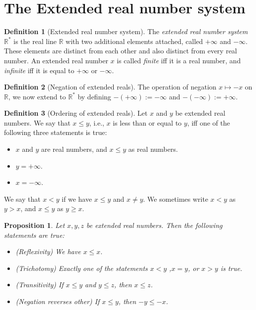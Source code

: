 \documentclass[
]{book}
\providecommand{\tightlist}{%
  \setlength{\itemsep}{0pt}\setlength{\parskip}{0pt}}
\newtheorem{proposition}{Proposition}[chapter]
\theoremstyle{definition}
\newtheorem{definition}{Definition}[chapter]
\theoremstyle{definition}
\theoremstyle{definition}
\theoremstyle{definition}
\theoremstyle{remark}
\begin{document}
\section{The Extended real number system}\label{the-extended-real-number-system}

\begin{definition}[Extended real number system]
The \emph{extended real number system} \(\mathbb{R}^{\ast}\) is the real line \(\mathbb{R}\) with two additional elements attached, called \(+\infty\) and \(-\infty\). These elements are distinct from each other and also distinct from every real number. An extended real number \(x\) is called \emph{finite} iff it is a real number, and \emph{infinite} iff it is equal to \(+\infty\) or \(-\infty\).
\end{definition}

\begin{definition}[Negation of extended reals]
The operation of negation \(x\mapsto -x\) on \(\mathbb{R}\), we now extend to \(\mathbb{R}^{\ast}\) by defining \(-(+\infty):=-\infty\) and \(-(-\infty):=+\infty\).
\end{definition}

\begin{definition}[Ordering of extended reals]
Let \(x\) and \(y\) be extended real numbers. We say that \(x\leq y\), i.e., \(x\) is less than or equal to \(y\), iff one of the following three statements is true:

\begin{itemize}
\tightlist
\item
  \(x\) and \(y\) are real numbers, and \(x\leq y\) as real numbers.
\item
  \(y=+\infty\).
\item
  \(x=-\infty\).
\end{itemize}

We say that \(x<y\) if we have \(x\leq y\) and \(x\ne y\). We sometimes write \(x<y\) as \(y>x\), and \(x\leq y\) as \(y\geq x\).
\end{definition}

\begin{proposition}

Let \(x,y,z\) be extended real numbers. Then the following statements are true:

\begin{itemize}
\tightlist
\item
  (Reflexivity) We have \(x\leq x\).
\item
  (Trichotomy) Exactly one of the statements \(x<y\) ,\(x=y\), or \(x>y\) is true.
\item
  (Transitivity) If \(x\leq y\) and \(y\leq z\), then \(x\leq z\).
\item
  (Negation reverses other) If \(x\leq y\), then \(-y\leq -x\).
\end{itemize}

\end{proposition}
\end{document}

